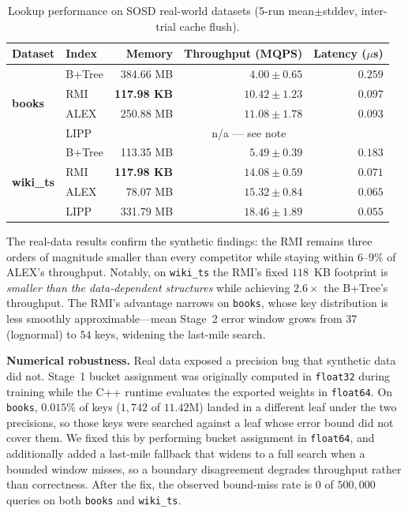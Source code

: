 \documentclass[10pt,twocolumn,a4paper]{article}
\begin{document}
\begin{table}[t]
\centering
\caption{Lookup performance on SOSD real-world datasets (5-run mean$\pm$stddev, inter-trial cache flush).}
\label{tab:sosd}
\begin{tabular}{llrrr}
\toprule
\textbf{Dataset} & \textbf{Index} & \textbf{Memory} & \textbf{Throughput (MQPS)} & \textbf{Latency ($\mu$s)} \\
\midrule
\multirow{4}{*}{\textbf{books}}
 & B+Tree & 384.66 MB & $4.00 \pm 0.65$ & $0.259$ \\
 & RMI    & \textbf{117.98 KB} & $10.42 \pm 1.23$ & $0.097$ \\
 & ALEX   & 250.88 MB & $\mathbf{11.08 \pm 1.78}$ & $\mathbf{0.093}$ \\
 & LIPP   & \multicolumn{3}{c}{n/a --- see note} \\
\midrule
\multirow{4}{*}{\textbf{wiki\_ts}}
 & B+Tree & 113.35 MB & $5.49 \pm 0.39$ & $0.183$ \\
 & RMI    & \textbf{117.98 KB} & $14.08 \pm 0.59$ & $0.071$ \\
 & ALEX   & 78.07 MB  & $15.32 \pm 0.84$ & $0.065$ \\
 & LIPP   & 331.79 MB & $\mathbf{18.46 \pm 1.89}$ & $\mathbf{0.055}$ \\
\bottomrule
\end{tabular}
\end{table}

The real-data results confirm the synthetic findings: the RMI remains three orders of magnitude smaller than every competitor while staying within $6$--$9\%$ of ALEX's throughput. Notably, on \texttt{wiki\_ts} the RMI's fixed $118$~KB footprint is \textit{smaller than the data-dependent structures} while achieving $2.6\times$ the B+Tree's throughput. The RMI's advantage narrows on \texttt{books}, whose key distribution is less smoothly approximable---mean Stage~2 error window grows from $37$ (lognormal) to $54$ keys, widening the last-mile search.

\medskip
\noindent\textbf{Numerical robustness.} Real data exposed a precision bug that synthetic data did not. Stage~1 bucket assignment was originally computed in \texttt{float32} during training while the C++ runtime evaluates the exported weights in \texttt{float64}. On \texttt{books}, $0.015\%$ of keys ($1{,}742$ of $11.42$M) landed in a different leaf under the two precisions, so those keys were searched against a leaf whose error bound did not cover them. We fixed this by performing bucket assignment in \texttt{float64}, and additionally added a last-mile fallback that widens to a full search when a bounded window misses, so a boundary disagreement degrades throughput rather than correctness. After the fix, the observed bound-miss rate is $0$ of $500{,}000$ queries on both \texttt{books} and \texttt{wiki\_ts}.
\end{document}
